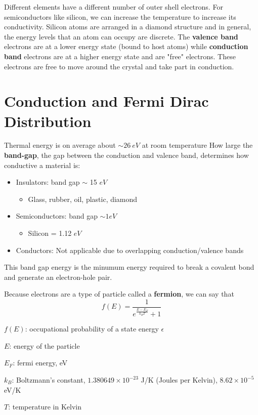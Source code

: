 Different elements have a different number of outer shell electrons. For semiconductors like silicon, we can increase the temperature to increase its conductivity. Silicon atoms are arranged in a diamond structure and in general, the energy levels that an atom can occupy are discrete. The \textbf{valence band} electrons are at a lower energy state (bound to host atoms) while \textbf{conduction band} electrons are at a higher energy state and are "free" electrons. These electrons are free to move around the crystal and take part in conduction. 

\section{Conduction and Fermi Dirac Distribution}
Thermal energy is on average about $\sim 26~eV$ at room temperature How large the \textbf{band-gap}, the gap between the conduction and valence band, determines how conductive a material is:
\begin{itemize}
    \item Insulators: band gap $\sim$ 15 $eV$
    \begin{itemize}
        \item Glass, rubber, oil, plastic, diamond
    \end{itemize}
    \item Semiconductors: band gap $\sim 1 eV$
    \begin{itemize}
        \item Silicon = 1.12 $eV$
    \end{itemize}
    \item Conductors: Not applicable due to overlapping conduction/valence bands
\end{itemize}
This band gap energy is the minumum energy required to break a covalent bond and generate an electron-hole pair.

Because electrons are a type of particle called a \textbf{fermion}, we can say that 
\[f(E) = \frac{1}{e^{\frac{E - E_F}{k_B T}} + 1}\]
\begin{gline}
    \item $f(E)$: occupational probability of a state energy $\epsilon$
    \item $E$: energy of the particle
    \item $E_F$: fermi energy, eV
    \item $k_B$: Boltzmann's constant, $1.380649 \times 10^{-23}$ J/K (Joules per Kelvin), $8.62 \times 10^{-5}$ eV/K
    \item $T$: temperature in Kelvin
\end{gline}

